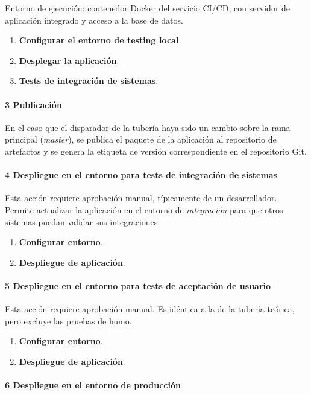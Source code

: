 Entorno de ejecución: contenedor Docker del servicio CI/CD, con servidor de aplicación integrado y acceso a la base de datos.

\begin{enumerate}
\item \textbf{Configurar el entorno de testing local}.
\item \textbf{Desplegar la aplicación}.
\item \textbf{Tests de integración de sistemas}.
\end{enumerate}
\paragraph{3 Publicación}

En el caso que el disparador de la tubería haya sido un cambio sobre la rama principal (\textit{master}), se publica el paquete de la aplicación al repositorio de artefactos y se genera la etiqueta de versión correspondiente en el repositorio Git.

\paragraph{4 Despliegue en el entorno para tests de integración de sistemas}

Esta acción requiere aprobación manual, típicamente de un desarrollador. Permite actualizar la aplicación en el entorno de \textit{integración} para que otros sistemas puedan validar sus integraciones.

\begin{enumerate}
\item \textbf{Configurar entorno}.
\item \textbf{Despliegue de aplicación}.
\end{enumerate}
\paragraph{5 Despliegue en el entorno para tests de aceptación de usuario}

Esta acción requiere aprobación manual. Es idéntica a la de la tubería teórica, pero excluye las pruebas de humo.

\begin{enumerate}
\item \textbf{Configurar entorno}.
\item \textbf{Despliegue de aplicación}.
\end{enumerate}
\paragraph{6 Despliegue en el entorno de producción}

